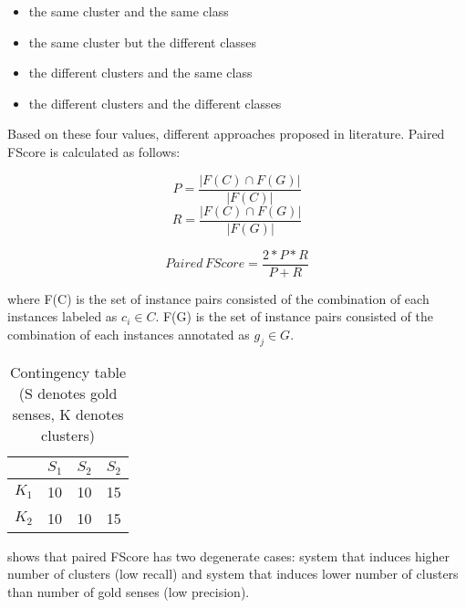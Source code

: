 \begin{itemize}
\item the same cluster and the same class
\item the same cluster but the different classes
\item the different clusters and the same class
\item the different clusters and the different classes
\end{itemize}

Based on these four values, different approaches proposed in literature. Paired FScore is calculated as follows:

\begin{equation}
P = \dfrac{|F(C) \cap F(G)|}{|F(C)|}
\end{equation}
\begin{equation}
R = \dfrac{|F(C) \cap F(G)|}{|F(G)|}
\end{equation}

\begin{equation}
Paired \, FScore = \dfrac{2 * P * R}{P + R}
\end{equation}

where F(C) is the set of instance pairs consisted of the combination of each instances labeled as $c_i \in C$. F(G) is the set of instance pairs consisted of the combination of each instances annotated as $g_j \in G$. \\


\begin{table}
\begin{center}
    \begin{tabular}{ | l | l | l | l |}
    \hline  & \bf $S_1$ & \bf $S_2$ & \bf $S_2$ \\ \hline
    \bf $K_1$ & 10 & 10 & 15 \\ \hline
    \bf $K_2$ & 10 & 10 & 15 \\ \hline
    \end{tabular}
\end{center}
    \caption{\label{table:contingency} Contingency table (S denotes gold senses, K denotes clusters)}
\end{table}



\cite{apidianaki2011quantitative} shows that paired FScore has two degenerate cases: system that induces higher number of clusters (low recall) and system that induces lower number of clusters than number of gold senses (low precision).



